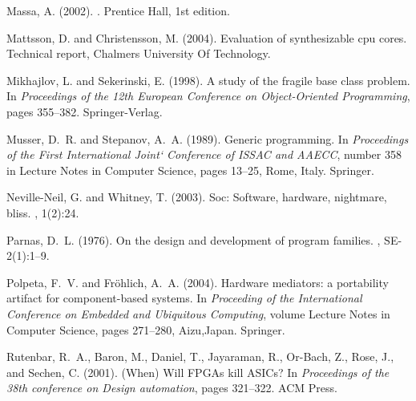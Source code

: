 \documentclass{kapproc} %
\begin{document}
\begin{chapthebibliography}{1}
Massa, A. (2002).
.
\newblock Prentice Hall, 1st edition.

Mattsson, D. and Christensson, M. (2004).
\newblock Evaluation of synthesizable cpu cores.
\newblock Technical report, Chalmers University Of Technology.

Mikhajlov, L. and Sekerinski, E. (1998).
\newblock A study of the fragile base class problem.
\newblock In {\em Proceedings of the 12th European Conference on
  Object-Oriented Programming}, pages 355--382. Springer-Verlag.

Musser, D.~R. and Stepanov, A.~A. (1989).
\newblock Generic programming.
\newblock In {\em Proceedings of the First International Joint` Conference of
  ISSAC and AAECC}, number 358 in Lecture Notes in Computer Science, pages
  13--25, Rome, Italy. Springer.

Neville-Neil, G. and Whitney, T. (2003).
\newblock Soc: Software, hardware, nightmare, bliss.
, 1(2):24.

Parnas, D.~L. (1976).
\newblock On the design and development of program families.
, SE-2(1):1--9.

Polpeta, F.~V. and Fr\"ohlich, A.~A. (2004).
\newblock Hardware mediators: a portability artifact for component-based
  systems.
\newblock In {\em Proceeding of the International Conference on Embedded and
  Ubiquitous Computing}, volume Lecture Notes in Computer Science, pages
  271--280, Aizu,Japan. Springer.

Rutenbar, R.~A., Baron, M., Daniel, T., Jayaraman, R., Or-Bach, Z., Rose, J.,
  and Sechen, C. (2001).
\newblock (When) Will FPGAs kill ASICs?
\newblock In {\em Proceedings of the 38th conference on Design automation},
  pages 321--322. ACM Press.

\end{chapthebibliography}
\end{document}
